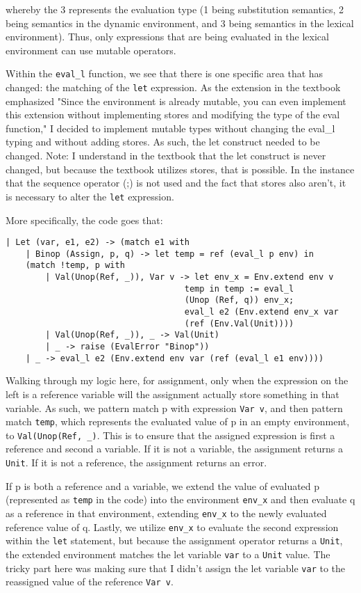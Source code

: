\documentclass{article}
\def\code#1{\texttt{#1}}
\begin{document}
whereby the 3 represents the evaluation type (1 being substitution semantics, 2 being semantics in the dynamic environment, and 3 being semantics in the lexical environment). Thus, only expressions that are being evaluated in the lexical environment can use mutable operators. 

Within the \code{eval\_l} function, we see that there is one specific area that has changed: the matching of the \code{let} expression. As the extension in the textbook emphasized "Since the environment is already mutable, you can even implement this extension without implementing stores and modifying
the type of the eval function," I decided to implement mutable types without changing the eval\_l typing and without adding stores. As such, the let construct needed to be changed. Note: I understand in the textbook that the let construct is never changed, but because the textbook utilizes stores, that is possible. In the instance that the sequence operator (;) is not used and the fact that stores also aren't, it is necessary to alter the \code{let} expression. 

More specifically, the code goes that: \\
\begin{verbatim}
| Let (var, e1, e2) -> (match e1 with  
    | Binop (Assign, p, q) -> let temp = ref (eval_l p env) in 
    (match !temp, p with 
        | Val(Unop(Ref, _)), Var v -> let env_x = Env.extend env v 
                                    temp in temp := eval_l 
                                    (Unop (Ref, q)) env_x; 
                                    eval_l e2 (Env.extend env_x var 
                                    (ref (Env.Val(Unit)))) 
        | Val(Unop(Ref, _)), _ -> Val(Unit) 
        | _ -> raise (EvalError "Binop"))
    | _ -> eval_l e2 (Env.extend env var (ref (eval_l e1 env))))
\end{verbatim}

Walking through my logic here, for assignment, only when the expression on the left is a reference variable will the assignment actually store something in that variable. As such, we pattern match p with expression \code{Var v}, and then pattern match \code{temp}, which represents the evaluated value of p in an empty environment, to \code{Val(Unop(Ref, \_)}. This is to ensure that the assigned expression is first a reference and second a variable. If it is not a variable, the assignment returns a \code{Unit}. If it is not a reference, the assignment returns an error. 

If p is both a reference and a variable, we extend the value of evaluated p (represented as \code{temp} in the code) into the environment \code{env\_x} and then evaluate q as a reference in that environment, extending \code{env\_x} to the newly evaluated reference value of q. Lastly, we utilize \code{env\_x} to evaluate the second expression within the \code{let} statement, but because the assignment operator returns a \code{Unit}, the extended environment matches the let variable \code{var} to a \code{Unit} value. The tricky part here was making sure that I didn't assign the let variable \code{var} to the reassigned value of the reference \code{Var v}. 
\end{document}
